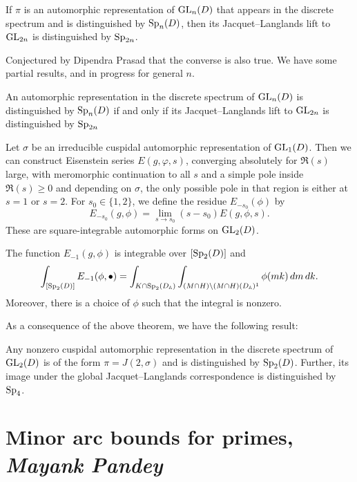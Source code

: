 \documentclass[reqno]{amsart} 
\begin{document}
\begin{theorem}
  If $\pi$ is an automorphic representation of $\operatorname{GL}_n(D)$ that appears in the discrete spectrum and is distinguished by $\operatorname{Sp}_n(D)$, then its Jacquet--Langlands lift to $\operatorname{GL}_{2 n}$ is distinguished by $\operatorname{Sp}_{2 n}$.
\end{theorem}
Conjectured by Dipendra Prasad that the converse is also true.  We have some partial results, and in progress for general $n$.
\begin{conjecture}
  An automorphic representation in the discrete spectrum of $\operatorname{GL}_n(D)$ is distinguished by $\operatorname{Sp}_n(D)$ if and only if its Jacquet--Langlands lift to $\operatorname{GL}_{2 n}$ is distinguished by $\operatorname{Sp}_{2 n}$
\end{conjecture}

Let $\sigma$ be an irreducible cuspidal automorphic representation of $\operatorname{GL}_1(D)$.  Then we can construct Eisenstein series $E(g, \varphi, s)$, converging absolutely for $\Re(s)$ large, with meromorphic continuation to all $s$ and a simple pole inside $\Re(s) \geq 0$ and depending on $\sigma$, the only possible pole in that region is either at $s = 1$ or $s = 2$.  For $s_0 \in \{1, 2\}$, we define the residue $E_{- s_0}(\phi)$ by
\begin{equation*}
  E_{- s_0}(g, \phi) = \lim_{s \rightarrow s_0}(s - s_0) E(g, \phi, s).
\end{equation*}
These are square-integrable automorphic forms on $\operatorname{GL}_{2}(D)$.

\begin{theorem}
  The function $E_{- 1}(g, \phi)$ is integrable over $[\operatorname{Sp}_2(D)]$ and
  \begin{equation*}
    \int_{[\operatorname{Sp}_2(D)]} E_{- 1}(\phi, \bullet)
    = \int_{K \cap \operatorname{Sp}_2(D_{\mathbb{A}})}
    \int_{(M \cap H) \backslash(M \cap H)(D_{\mathbb{A}})^1}
    \phi(m k) \, d m \, d k.
  \end{equation*}
  Moreover, there is a choice of $\phi$ such that the integral is nonzero.
\end{theorem}
As a consequence of the above theorem, we have the following result:
\begin{theorem}
  Any nonzero cuspidal automorphic representation in the discrete spectrum of $\operatorname{GL}_2(D)$ is of the form $\pi = J(2, \sigma)$ and is distinguished by $\operatorname{Sp}_2(D)$.  Further, its image under the global Jacquet--Langlands correspondence is distinguished by $\operatorname{Sp}_4$.
\end{theorem}


\section{Minor arc bounds for primes, \textnormal{\emph{Mayank Pandey}}}
\end{document}
